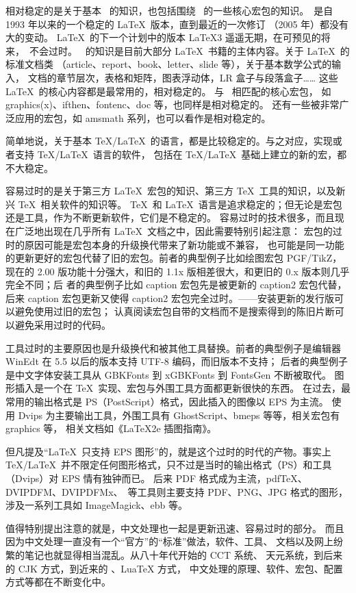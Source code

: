 相对稳定的是关于基本 \LaTeXe\
的知识，也包括围绕 \LaTeXe\ 的一些核心宏包的知识。\LaTeXe\
是自 1993 年以来的一个稳定的 \LaTeX\ 版本，直到最近的一次修订
（2005 年）都没有大的变动。
\LaTeX\ 的下一个计划中的版本 \LaTeX 3 遥遥无期，在可预见的将来，\LaTeXe\ 不会过时。
\LaTeXe\ 的知识是目前大部分 \LaTeX\ 书籍的主体内容。关于 \LaTeX\ 的标准文档类
（article、report、book、letter、slide 等），关于基本数学公式的输入，
文档的章节层次，表格和矩阵，图表浮动体，LR 盒子与段落盒子……
这些 \LaTeX\ 的核心内容都是最常用的，相对稳定的。
与 \LaTeXe\ 相匹配的核心宏包，
如 graphics(x)、ifthen、fontenc、doc 等，也同样是相对稳定的。
还有一些被非常广泛应用的宏包，如 amsmath 系列，也可以看作是相对稳定的。

简单地说，关于基本 \TeX/\LaTeX\ 的语言，都是比较稳定的。与之对应，实现或者支持 \TeX/\LaTeX\ 语言的软件，
包括在 \TeX/\LaTeX\ 基础上建立的新的宏，都不大稳定。

容易过时的是关于第三方 \LaTeX\ 宏包的知识、第三方 \TeX\ 工具的知识，以及新兴 \TeX\ 相关软件的知识等。
\TeX\ 和 \LaTeX\ 语言是追求稳定的；但无论是宏包还是工具，作为不断更新软件，它们是不稳定的。
容易过时的技术很多，而且现在广泛地出现在几乎所有 \LaTeX\ 文档之中，因此需要特别引起注意：
宏包的过时的原因可能是宏包本身的升级换代带来了新功能或不兼容，
也可能是同一功能的更新更好的宏包代替了旧的宏包。前者的典型例子比如绘图宏包 PGF/TikZ，
现在的 2.00 版功能十分强大，和旧的 1.1x 版相差很大，和更旧的 0.x 版本则几乎完全不同；后
者的典型例子比如 caption 宏包先是被更新的 caption2 宏包代替，后来 caption 宏包更新又使得
caption2 宏包完全过时。——安装更新的发行版可以避免使用过旧的宏包；
认真阅读宏包自带的文档而不是搜索得到的陈旧片断可以避免采用过时的代码。

工具过时的主要原因也是升级换代和被其他工具替换。前者的典型例子是编辑器
WinEdt 在 5.5 以后的版本支持 UTF-8 编码，而旧版本不支持；
后者的典型例子是中文字体安装工具从 GBKFonts 到 xGBKFonts 到 FontsGen 不断被取代。
图形插入是一个在 \TeX\ 实现、宏包与外围工具方面都更新很快的东西。
在过去，最常用的输出格式是 PS（PostScript）格式，因此插入的图像以 EPS 为主流。
使用 Dvips 为主要输出工具，外围工具有 GhostScript、bmeps 等等，相关宏包有 graphics 等，
相关文档如《LaTeX2e 插图指南》。

但凡提及“\LaTeX\ 只支持 EPS 图形”的，就是这个过时的时代的产物。事实上 \TeX/\LaTeX\
并不限定任何图形格式，只不过是当时的输出格式（PS）和工具（Dvips）对 EPS 情有独钟而已。
后来 PDF 格式成为主流，pdf\TeX、DVIPDFM、DVIPDFMx、\XeTeX\ 等工具则主要支持 PDF、PNG、JPG 格式的图形，
涉及一系列工具如 ImageMagick、ebb 等。

值得特别提出注意的就是，中文处理也一起是更新迅速、容易过时的部分。
而且因为中文处理一直没有一个“官方”的“标准”做法，软件、工具、
文档以及网上纷繁的笔记也就显得相当混乱。从八十年代开始的 CCT 系统、
天元系统，到后来的 CJK 方式，到近来的 \XeTeX、LuaTeX 方式，
中文处理的原理、软件、宏包、配置方式等都在不断变化中。



